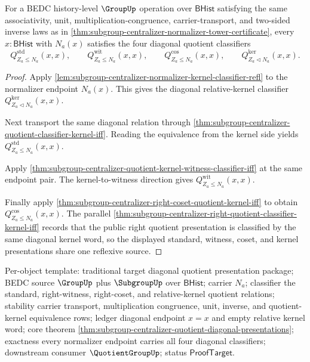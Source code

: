 \begin{theorem}
\label{thm:subgroup-centralizer-quotient-diagonal-presentations}
For a BEDC history-level $\GroupUp$ operation over $\mathsf{BHist}$
satisfying the same associativity, unit, multiplication-congruence,
carrier-transport, and two-sided inverse laws as in
\autoref{thm:subgroup-centralizer-normalizer-tower-certificate}, every
$x:\mathsf{BHist}$ with $N_a(x)$ satisfies the four diagonal quotient
classifiers
$$
Q^{\mathrm{std}}_{Z_a\leq N_a}(x,x),\qquad
Q^{\mathrm{wit}}_{Z_a\leq N_a}(x,x),\qquad
Q^{\mathrm{cos}}_{Z_a\leq N_a}(x,x),\qquad
Q^{\mathrm{ker}}_{Z_a\triangleleft N_a}(x,x).
$$
\end{theorem}
\begin{proof}
Apply
\autoref{lem:subgroup-centralizer-normalizer-kernel-classifier-refl} to the
normalizer endpoint $N_a(x)$. This gives the diagonal relative-kernel
classifier $Q^{\mathrm{ker}}_{Z_a\triangleleft N_a}(x,x)$.

Next transport the same diagonal relation through
\autoref{thm:subgroup-centralizer-quotient-classifier-kernel-iff}. Reading
the equivalence from the kernel side yields
$Q^{\mathrm{std}}_{Z_a\leq N_a}(x,x)$.

Apply
\autoref{thm:subgroup-centralizer-quotient-kernel-witness-classifier-iff} at
the same endpoint pair. The kernel-to-witness direction gives
$Q^{\mathrm{wit}}_{Z_a\leq N_a}(x,x)$.

Finally apply
\autoref{thm:subgroup-centralizer-right-coset-quotient-kernel-iff}
to obtain $Q^{\mathrm{cos}}_{Z_a\leq N_a}(x,x)$. The parallel
\autoref{thm:subgroup-centralizer-right-quotient-classifier-kernel-iff}
records that the public right quotient presentation is classified by the same
diagonal kernel word, so the displayed standard, witness, coset, and kernel
presentations share one reflexive source.
\end{proof}

Per-object template: traditional target diagonal quotient presentation
package; BEDC source $\GroupUp$ plus $\SubgroupUp$ over $\mathsf{BHist}$;
carrier $N_a$; classifier the standard, right-witness, right-coset, and
relative-kernel quotient relations; stability carrier transport,
multiplication congruence, unit, inverse, and quotient-kernel equivalence
rows; ledger diagonal endpoint $x=x$ and empty relative kernel word; core
theorem
\autoref{thm:subgroup-centralizer-quotient-diagonal-presentations};
exactness every normalizer endpoint carries all four diagonal classifiers;
downstream consumer $\QuotientGroupUp$; status $\mathsf{ProofTarget}$.

